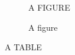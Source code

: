 \documentclass{article}
\begin{document}
\begin{figure}
\centering A FIGURE
\caption{A figure}
\end{figure}

\begin{table}
\centering A TABLE
\caption{A table}
\end{table}
\end{document}
